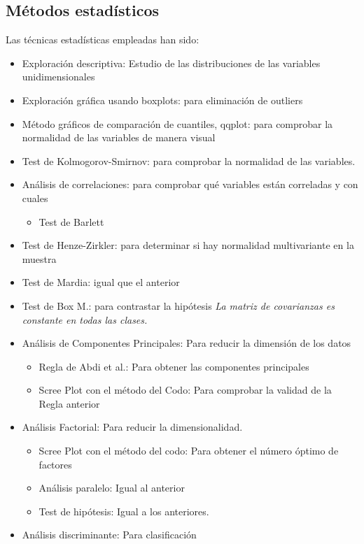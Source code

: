 \documentclass[11pt,a4paper]{article}
\begin{document}
	\subsection{Métodos estadísticos} 
	
    	Las técnicas estadísticas empleadas han sido: 
    	
    	\begin{itemize}
    
    	    \item Exploración descriptiva: Estudio de las distribuciones de las variables unidimensionales
    	    \item Exploración gráfica usando boxplots: para eliminación de outliers
    	    \item Método gráficos de comparación de cuantiles, qqplot: para comprobar la normalidad de las variables de manera visual
    	    \item Test de Kolmogorov-Smirnov: para comprobar la normalidad de las variables.
    	    
    	    \item Análisis de correlaciones: para comprobar qué variables están correladas y con cuales
    	    \begin{itemize}
    	        \item Test de Barlett
    	    \end{itemize}
    	    \item Test de Henze-Zirkler: para determinar si hay normalidad multivariante en la muestra
    	    \item Test de Mardia: igual que el anterior
    	    \item Test de Box M.: para contrastar la hipótesis \textit{La matriz de covarianzas es constante en todas las clases.}
    	    \item Análisis de Componentes Principales: Para reducir la dimensión de los datos
        	    \begin{itemize}
            	    \item Regla de Abdi et al.: Para obtener las componentes principales
            	    \item Scree Plot con el método del Codo: Para comprobar la validad de la Regla anterior
        	    \end{itemize}
    
    	    \item Análisis Factorial: Para reducir la dimensionalidad.
        	    \begin{itemize}
            	    \item Scree Plot con el método del codo: Para obtener el número óptimo de factores
            	    \item Análisis paralelo: Igual al anterior
                    \item Test de hipótesis: Igual a los anteriores. 
        	    \end{itemize}
        	    
    	    \item Análisis discriminante: Para clasificación
    	\end{itemize}
    	
\end{document}
